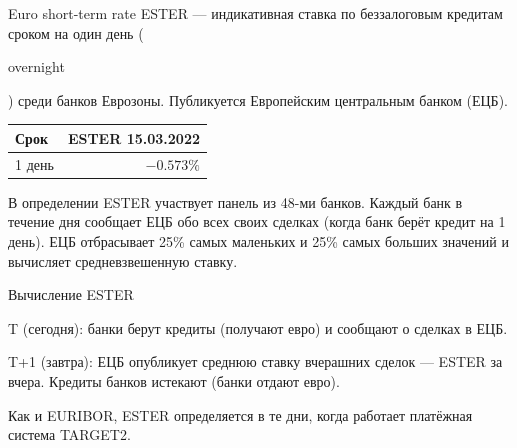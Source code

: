 \documentclass{beamer}
\newcommand{\en}[1]{\begin{otherlanguage}{english}#1\end{otherlanguage}}
\begin{document}
\begin{frame}{Euro short-term rate}
\justify
\alert{ESTER} --- индикативная ставка по беззалоговым кредитам сроком на один день (\en{overnight}) среди банков Еврозоны. Публикуется Европейским центральным банком (ЕЦБ).

\justify
\centering
\begin{tabular}{l|r}
Срок   & ESTER 15.03.2022 \\ \hline
1 день & $-0.573\%$
\end{tabular}

\justify
В определении ESTER участвует панель из 48-ми банков. Каждый банк в течение дня сообщает ЕЦБ обо всех своих сделках (когда банк берёт кредит на 1 день). ЕЦБ отбрасывает 25\% самых маленьких и 25\% самых больших значений и вычисляет средневзвешенную ставку.
\end{frame}



\begin{frame}{Вычисление ESTER}
\justify
\centering
{}

\justify
T (сегодня): банки берут кредиты (получают евро) и сообщают о сделках в ЕЦБ.

T+1 (завтра): ЕЦБ опубликует среднюю ставку вчерашних сделок --- ESTER за вчера. Кредиты банков истекают (банки отдают евро).

\justify
Как и EURIBOR, ESTER определяется в те дни, когда работает платёжная система TARGET2.
\end{frame}



\newcommand{\plotBenchmarkRate}[2] {
	
	\addplot[
		color = #2,
		mark = none,
		thick
	]
	table[
		x=date,
		y=#1,
		col sep=comma
	]
	{euro_benchmark.csv};
}
\end{document}
